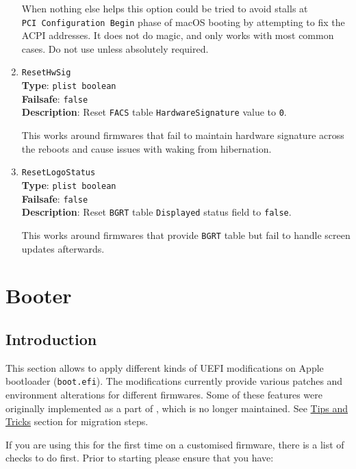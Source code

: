 \documentclass[]{article}
\begin{document}
\begin{enumerate}
  When nothing else helps this option could be tried to avoid stalls at
  \texttt{PCI\ Configuration\ Begin} phase of macOS booting by
  attempting to fix the ACPI addresses. It does not do magic, and only
  works with most common cases. Do not use unless absolutely required.

\item
  \texttt{ResetHwSig}\\
  \textbf{Type}: \texttt{plist\ boolean}\\
  \textbf{Failsafe}: \texttt{false}\\
  \textbf{Description}: Reset \texttt{FACS} table \texttt{HardwareSignature}
  value to \texttt{0}.

  This works around firmwares that fail to maintain hardware signature across
  the reboots and cause issues with waking from hibernation.

\item
  \texttt{ResetLogoStatus}\\
  \textbf{Type}: \texttt{plist\ boolean}\\
  \textbf{Failsafe}: \texttt{false}\\
  \textbf{Description}: Reset \texttt{BGRT} table \texttt{Displayed}
  status field to \texttt{false}.

  This works around firmwares that provide \texttt{BGRT} table but
  fail to handle screen updates afterwards.

\end{enumerate}


\section{Booter}\label{booter}

\subsection{Introduction}\label{booterintro}

This section allows to apply different kinds of UEFI modifications on
Apple bootloader (\texttt{boot.efi}). The modifications currently provide
various patches and environment alterations for different firmwares. Some
of these features were originally implemented as a part of
\href{https://github.com/acidanthera/AptioFixPkg}{},
which is no longer maintained. See \hyperref[troubleshootingtricks]{Tips and Tricks}
section for migration steps.

If you are using this for the first time on a customised firmware, there is a
list of checks to do first. Prior to starting please ensure that you have:
\end{document}
